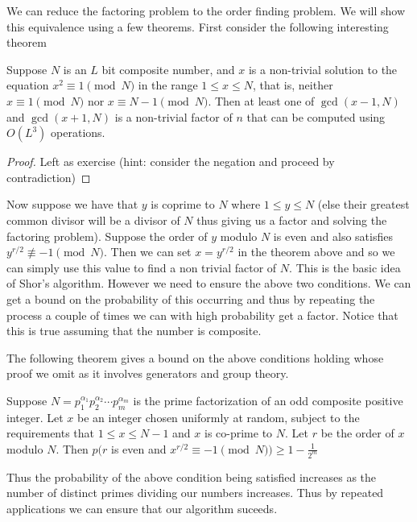 We can reduce the factoring problem to the order finding problem. We will show this equivalence using a few theorems. First consider the following interesting theorem

\begin{theorem}
Suppose $N$ is an $L$ bit composite number, and $x$ is a non-trivial solution to the equation $x^2 \equiv  1 \pmod N$ in the range $1 \leq x \leq N$, that is, neither $x \equiv 1  \pmod N$ nor $x \equiv N - 1 \pmod N$. Then at least one of $\gcd(x − 1, N)$ and $\gcd(x + 1, N)$ is a non-trivial factor of $n$ that can be computed using $O(L^3)$ operations.
\end{theorem}
\begin{proof}
Left as exercise (hint: consider the negation and proceed by contradiction)
\end{proof}

Now suppose we have that $y$ is coprime to $N$ where $ 1 \leq y \leq N$ (else their greatest common divisor will be a divisor of $N$ thus giving us a factor and solving the factoring problem). Suppose the order of $y$ modulo $N$ is even and also satisfies $y^{r/2} \not\equiv -1 \pmod N$. Then we can set $x = y^{r/2}$ in the theorem above and so we can simply use this value to find a non trivial factor of $N$. This is the basic idea of Shor's algorithm. However we need to ensure the above two conditions. We can get a bound on the probability of this occurring and thus by repeating the process a couple of times we can with high probability get a factor. Notice that this is true assuming that the number is composite.

The following theorem gives a bound on the above conditions holding whose proof we omit as it involves generators and group theory.

\begin{theorem}
Suppose $N = p_1^{\alpha_{1}}p_2^{\alpha_{2}} \cdots p_m^{\alpha_m}$ is the prime factorization of an odd composite
positive integer. Let $x$ be an integer chosen uniformly at random, subject to the
requirements that $1 \leq x\leq N - 1$ and $x$ is co-prime to $N$. Let $r$ be the order of
$x$ modulo $N$. Then
$p(r$ is even and $x^{r/2} \equiv − 1 \pmod N ) \geq 1 - \frac{1}{2^m}$
\end{theorem}

Thus the probability of the above condition being satisfied increases as the number of distinct primes dividing our numbers increases. Thus by repeated applications we can ensure that our algorithm suceeds.\\

